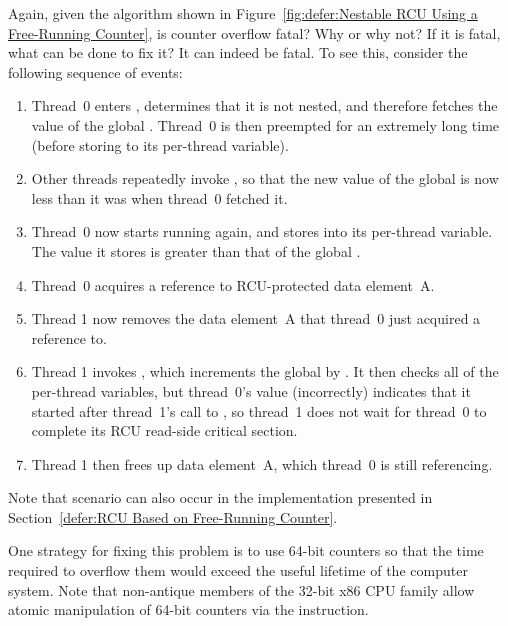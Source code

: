 \QuickQ{}
	Again, given the algorithm shown in
	Figure~\ref{fig:defer:Nestable RCU Using a Free-Running Counter},
	is counter overflow fatal?
	Why or why not?
	If it is fatal, what can be done to fix it?
\QuickA{}
	It can indeed be fatal.
	To see this, consider the following sequence of events:
	\begin{enumerate}
	\item	Thread~0 enters , determines
		that it is not nested, and therefore fetches the
		value of the global .
		Thread~0 is then preempted for an extremely long time
		(before storing to its per-thread 
		variable).
	\item	Other threads repeatedly invoke ,
		so that the new value of the global 
		is now 
		less than it was when thread~0 fetched it.
	\item	Thread~0 now starts running again, and stores into
		its per-thread  variable.
		The value it stores is
		greater than that of the global .
	\item	Thread~0 acquires a reference to RCU-protected data
		element~A.
	\item	Thread 1 now removes the data element~A that thread~0
		just acquired a reference to.
	\item	Thread 1 invokes , which
		increments the global  by
		.
		It then checks all of the per-thread 
		variables, but thread~0's value (incorrectly) indicates
		that it started after thread~1's call to
		, so thread~1 does not wait
		for thread~0 to complete its RCU read-side critical
		section.
	\item	Thread 1 then frees up data element~A, which thread~0
		is still referencing.
	\end{enumerate}

	Note that scenario can also occur in the implementation presented in
	Section~\ref{defer:RCU Based on Free-Running Counter}.

	One strategy for fixing this problem is to use 64-bit
	counters so that the time required to overflow them would exceed
	the useful lifetime of the computer system.
	Note that non-antique members of the 32-bit x86 CPU family
	allow atomic manipulation of 64-bit counters via the
	 instruction.

